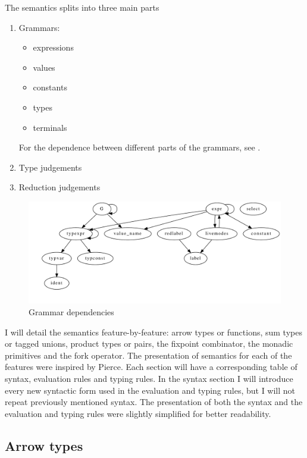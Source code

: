 \documentclass[12pt,twoside,notitlepage]{report}
\begin{document}
The semantics splits into three main parts
\begin{enumerate}
\item{Grammars:\begin{itemize}
\item{expressions}
\item{values}
\item{constants}
\item{types}
\item{terminals}
\end{itemize}
For the dependence between different parts of the grammars, see .}
\item{Type judgements}
\item{Reduction judgements}
\end{enumerate}

\begin{figure}[h]
\begin{center}
\includegraphics[width=\linewidth]{./../mconbaseDep}
\caption{Grammar dependencies}
\label{fig:grammardep}
\end{center}
\end{figure}


I will detail the semantics feature-by-feature: arrow types or functions, sum types or tagged unions, product types or pairs, the fixpoint combinator, the monadic primitives and the fork operator. The presentation of semantics for each of the features were inspired by Pierce\cite{pierce2002types}. Each section will have a corresponding table of syntax, evaluation rules and typing rules.  In the syntax section I will introduce every new syntactic form used in the evaluation and typing rules, but I will not repeat previously mentioned syntax. The presentation of both the syntax and the evaluation and typing rules were slightly simplified for better readability.  

\subsection{Arrow types}
\end{document}

